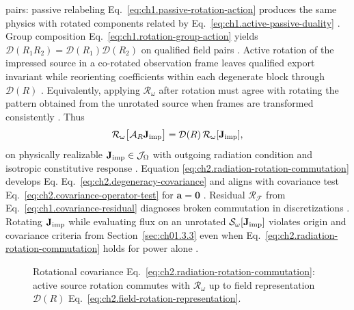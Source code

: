pairs: passive relabeling Eq.~\eqref{eq:ch1.passive-rotation-action} produces the same
physics with rotated components related by
Eq.~\eqref{eq:ch1.active-passive-duality} \cite{stratton1941}. Group composition
Eq.~\eqref{eq:ch1.rotation-group-action} yields
\(\mathcal{D}(R_1R_2)=\mathcal{D}(R_1)\mathcal{D}(R_2)\) on qualified field pairs
\cite{stratton1941}.
Active rotation of the impressed source in a co-rotated observation frame leaves qualified export
invariant while reorienting coefficients within each degenerate block through $\mathcal{D}(R)$
\cite{harrington2001}. Equivalently, applying $\mathcal{R}_\omega$ after rotation must agree with
rotating the pattern obtained from the unrotated source when frames are transformed consistently
\cite{stratton1941}. Thus
\begin{equation}
\label{eq:ch2.radiation-rotation-commutation}
\mathcal{R}_\omega\big[\mathcal{A}_R\mathbf{J}_{\mathrm{imp}}\big]
=
\mathcal{D}(R)\,\mathcal{R}_\omega[\mathbf{J}_{\mathrm{imp}}],
\end{equation}
on physically realizable \(\mathbf{J}_{\mathrm{imp}}\in\mathcal{J}_\Omega\) with outgoing radiation condition and isotropic
constitutive response \cite{stratton1941}. Equation
\eqref{eq:ch2.radiation-rotation-commutation} develops Eq.
Eq.~\eqref{eq:ch2.degeneracy-covariance} and aligns with covariance test
Eq.~\eqref{eq:ch2.covariance-operator-test} for \(\mathbf{a}=\mathbf{0}\)
\cite{stratton1941}. Residual \(\mathcal{R}_{\mathcal{F}}\) from
Eq.~\eqref{eq:ch1.covariance-residual} diagnoses broken commutation in discretizations
\cite{harrington2001}. Rotating
\(\mathbf{J}_{\mathrm{imp}}\) while evaluating flux on an unrotated \(\mathcal{S}_\omega[\mathbf{J}_{\mathrm{imp}}]\) violates
origin and covariance criteria from Section~\ref{sec:ch01.3.3} even when
Eq.~\eqref{eq:ch2.radiation-rotation-commutation} holds for power alone
\cite{stratton1941}.
\label{fig:ch2.radiation-rotation-commutation}
\begin{figure}[t]
\centering
{}
\caption{Rotational covariance Eq.~\eqref{eq:ch2.radiation-rotation-commutation}: active
source rotation commutes with \(\mathcal{R}_\omega\) up to field representation
\(\mathcal{D}(R)\) Eq.~\eqref{eq:ch2.field-rotation-representation}.}
\label{fig:ch2.rotation-spectral-covariance}
\end{figure}
